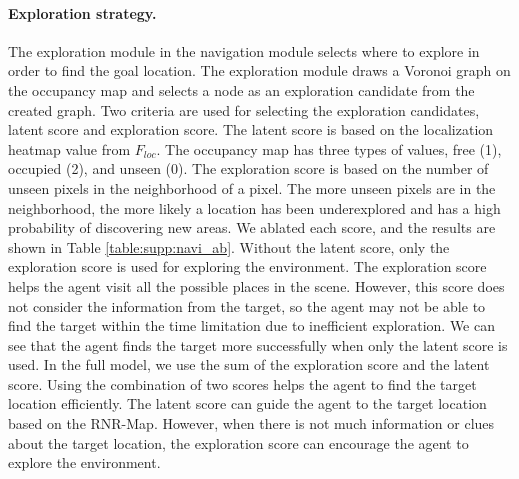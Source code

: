 \documentclass[10pt,twocolumn,letterpaper]{article}
\begin{document}

\paragraph{Exploration strategy.}
The exploration module in the navigation module selects where to explore in order to find the goal location.
%
The exploration module draws a Voronoi graph on the occupancy map and selects a node as an exploration candidate from the created graph.
%
Two criteria are used for selecting the exploration candidates, latent score and exploration score.
%
The latent score is based on the localization heatmap value from $F_{loc}$.
%
The occupancy map has three types of values, free (1), occupied (2), and unseen (0).
%
The exploration score is based on the number of unseen pixels in the neighborhood of a pixel.
%
The more unseen pixels are in the neighborhood, the more likely a location has been underexplored and has a high probability of discovering new areas.
%
We ablated each score, and the results are shown in Table \ref{table:supp:navi_ab}.
%
Without the latent score, only the exploration score is used for exploring the environment.
%
The exploration score helps the agent visit all the possible places in the scene.
%
However, this score does not consider the information from the target, so the agent may not be able to find the target within the time limitation due to inefficient exploration.
%
We can see that the agent finds the target more successfully when only the latent score is used.
%
In the full model, we use the sum of the exploration score and the latent score.
%
Using the combination of two scores helps the agent to find the target location efficiently.
%
The latent score can guide the agent to the target location based on the RNR-Map.
%
However, when there is not much information or clues about the target location, the exploration score can encourage the agent to explore the environment. 
\end{document}
